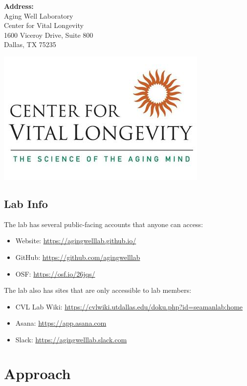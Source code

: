\documentclass[]{book}
\providecommand{\tightlist}{%
  \setlength{\itemsep}{0pt}\setlength{\parskip}{0pt}}
\begin{document}
\textbf{Address:}\\
Aging Well Laboratory\\
Center for Vital Longevity\\
1600 Viceroy Drive, Suite 800\\
Dallas, TX 75235

\includegraphics{images/cvl.jpg}

\hypertarget{lab-info}{%
\section{Lab Info}\label{lab-info}}

The lab has several public-facing accounts that anyone can access:

\begin{itemize}
\tightlist
\item
  Website: \url{https://agingwelllab.github.io/}
\item
  GitHub: \url{https://github.com/agingwelllab}
\item
  OSF: \url{https://osf.io/26jqs/}
\end{itemize}

The lab also has sites that are only accessible to lab members:

\begin{itemize}
\tightlist
\item
  CVL Lab Wiki: \url{https://cvlwiki.utdallas.edu/doku.php?id=seamanlab:home}
\item
  Asana: \url{https://app.asana.com}
\item
  Slack: \url{https://agingwelllab.slack.com}
\end{itemize}

\hypertarget{approach}{%
\chapter{Approach}\label{approach}}
\end{document}
